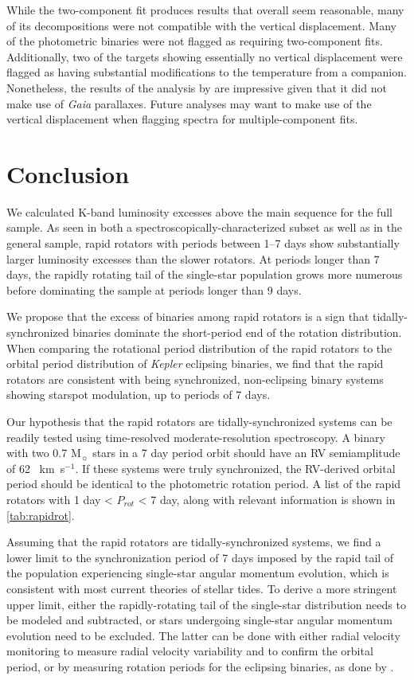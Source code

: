 \documentclass[manuscript]{aastex6}
\newcommand{\Kepler}{\mbox{\textit{Kepler}}}
\newcommand{\Gaia}{\mbox{\textit{Gaia}}}
\newcommand{\kms}{\textrm{~km~s}\ensuremath{^{-1}}}
\begin{document}
While the two-component fit produces results that overall seem reasonable, many
of its decompositions were not compatible with the vertical displacement. Many
of the photometric binaries were not flagged as requiring two-component fits.
Additionally, two of the targets showing essentially no vertical displacement
were flagged as having substantial modifications to the temperature from a
companion. Nonetheless, the results of the analysis by \citet{ElBadry18b} are
impressive given that it did not make use of \Gaia{} parallaxes. Future
analyses may want to make use of the vertical displacement when flagging
spectra for multiple-component fits.

\section{Conclusion}
\label{sec:conclusions}

We calculated K-band luminosity excesses above the main sequence for the full
\citet{McQuillan14} sample. As seen in both a spectroscopically-characterized
subset as well as in the general sample, rapid rotators with periods between
1--7 days show substantially larger luminosity excesses than the slower
rotators. At periods longer than 7 days, the rapidly rotating tail of the
single-star population grows more numerous before dominating the sample at
periods longer than 9 days. 

We propose that the excess of binaries among rapid rotators is a sign that
tidally-synchronized binaries dominate the short-period end of the rotation
distribution. When comparing the rotational period distribution of the rapid 
rotators to the orbital period distribution of \Kepler{} eclipsing binaries, we
find that the rapid rotators are consistent with being synchronized, 
non-eclipsing binary systems showing starspot modulation, up to periods of 7
days.

Our hypothesis that the rapid rotators are tidally-synchronized systems can be
readily tested using time-resolved moderate-resolution spectroscopy. A binary
with two 0.7 M\(_\sun\) stars in a 7 day period orbit should have an RV
semiamplitude of 62 \kms. If these systems were truly synchronized, the
RV-derived orbital period should be identical to the photometric rotation
period. A list of the rapid rotators with 1 day < \(P_{rot}\) < 7 day, along
with relevant information is shown in \cref{tab:rapidrot}.

Assuming that the rapid rotators are tidally-synchronized systems, we find a
lower limit to the synchronization period of 7 days imposed by the rapid tail
of the population experiencing single-star angular momentum evolution, which is
consistent with most current theories of stellar tides. To derive a more
stringent upper limit, either the rapidly-rotating tail of the single-star
distribution needs to be modeled and subtracted, or stars undergoing 
single-star angular momentum evolution need to be excluded. The latter can be
done with either radial velocity monitoring to measure radial velocity
variability and to confirm the orbital period, or by measuring rotation periods
for the eclipsing binaries, as done by \citet{Lurie17}.
\end{document}
